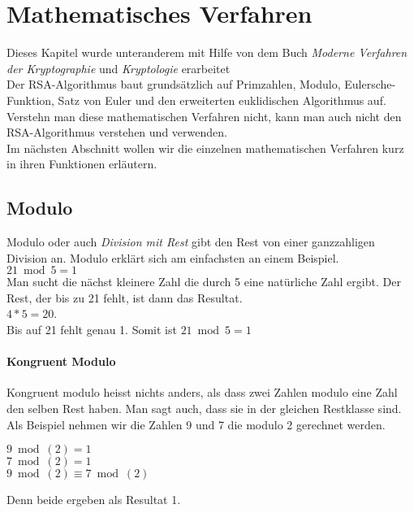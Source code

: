 \section{Mathematisches Verfahren}
Dieses Kapitel wurde unteranderem mit Hilfe von dem Buch \textit{Moderne Verfahren der Kryptographie} und \textit{Kryptologie} erarbeitet\\[2ex]
%
Der RSA-Algorithmus baut grundsätzlich auf Primzahlen, Modulo, Eulersche-Funktion, Satz von Euler und den erweiterten euklidischen Algorithmus auf. Verstehn man diese mathematischen Verfahren nicht, kann man auch nicht den RSA-Algorithmus verstehen und verwenden. \\
Im nächsten Abschnitt wollen wir die einzelnen mathematischen Verfahren kurz in ihren Funktionen erläutern.  
\subsection{Modulo}
Modulo oder auch \textit{Division mit Rest} gibt den Rest von einer ganzzahligen Division an. Modulo erklärt sich am einfachsten an einem Beispiel.\\
$ 21 \bmod 5 = 1 $ \\
Man sucht die nächst kleinere Zahl die durch 5 eine natürliche Zahl ergibt. Der Rest, der bis zu 21 fehlt, ist dann das Resultat.\\
 $ 4 * 5 = 20 $. \\
Bis auf 21 fehlt genau 1. Somit ist $ 21 \bmod 5 = 1 $
\paragraph{Kongruent Modulo}
Kongruent modulo heisst nichts anders, als dass zwei Zahlen modulo eine Zahl den selben Rest haben. Man sagt auch, dass sie in der gleichen Restklasse sind.\\
Als Beispiel nehmen wir die Zahlen 9 und 7 die modulo 2 gerechnet werden.\\
\begin{center}
$ 9 \bmod(2) = 1 $ \\
$ 7 \bmod(2) = 1 $ \\
$ 9 \bmod(2) \equiv 7 \bmod(2) $ \\
\end{center}
Denn beide ergeben als Resultat 1.
